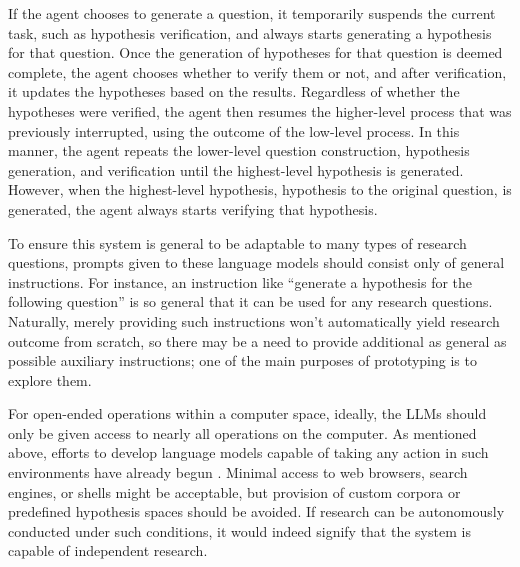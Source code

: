 If the agent chooses to generate a question, it temporarily suspends the current task, such as hypothesis verification, and always starts generating a hypothesis for that question. Once the generation of hypotheses for that question is deemed complete, the agent chooses whether to verify them or not, and after verification, it updates the hypotheses based on the results. Regardless of whether the hypotheses were verified, the agent then resumes the higher-level process that was previously interrupted, using the outcome of the low-level process. In this manner, the agent repeats the lower-level question construction, hypothesis generation, and verification until the highest-level hypothesis is generated. However, when the highest-level hypothesis, hypothesis to the original question, is generated, the agent always starts verifying that hypothesis.

To ensure this system is general to be adaptable to many types of research questions, prompts given to these language models should consist only of general instructions. For instance, an instruction like ``generate a hypothesis for the following question'' is so general that it can be used for any research questions. Naturally, merely providing such instructions won't automatically yield research outcome from scratch, so there may be a need to provide additional as general as possible auxiliary instructions; one of the main purposes of prototyping is to explore them. 

For open-ended operations within a computer space, ideally, the LLMs should only be given access to nearly all operations on the computer. As mentioned above, efforts to develop language models capable of taking any action in such environments have already begun \cite{openai_chatgpt_plugins_code_interpreter_2023,openinterpreter}. Minimal access to web browsers, search engines, or shells might be acceptable, but provision of custom corpora or predefined hypothesis spaces should be avoided. If research can be autonomously conducted under such conditions, it would indeed signify that the system is capable of independent research.

